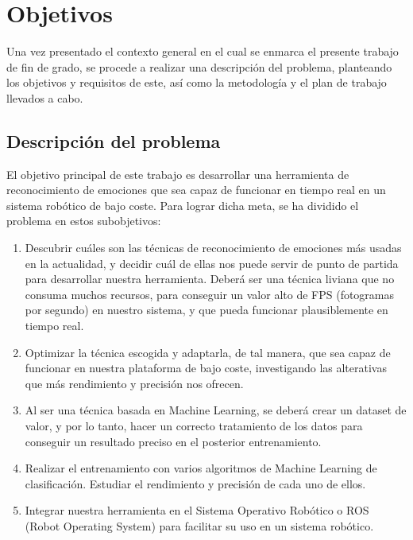 \chapter{Objetivos}
\label{cap:capitulo2}

Una vez presentado el contexto general en el cual se enmarca el presente trabajo de fin de grado, se procede a realizar una descripción del problema, planteando los objetivos y requisitos de este, así como la metodología y el plan de trabajo llevados a cabo.

\section{Descripción del problema}
\label{sec:descripcion}

El objetivo principal de este trabajo es desarrollar una herramienta de reconocimiento de emociones que sea capaz de funcionar en tiempo real en un sistema robótico de bajo coste. Para lograr dicha meta, se ha dividido el problema en estos subobjetivos:
\begin{enumerate}
    \item Descubrir cuáles son las técnicas de reconocimiento de emociones más usadas en la actualidad, y decidir cuál de ellas nos puede servir de punto de partida para desarrollar nuestra herramienta. Deberá ser una técnica liviana que no consuma muchos recursos, para conseguir un valor alto de FPS (fotogramas por segundo) en nuestro sistema, y que pueda funcionar plausiblemente en tiempo real.
    
    \item Optimizar la técnica escogida y adaptarla, de tal manera, que sea capaz de funcionar en nuestra plataforma de bajo coste, investigando las alterativas que más rendimiento y precisión nos ofrecen.
    
    \item Al ser una técnica basada en Machine Learning, se deberá crear un dataset de valor, y por lo tanto, hacer un correcto tratamiento de los datos para conseguir un resultado preciso en el posterior entrenamiento.
    
    \item Realizar el entrenamiento con varios algoritmos de Machine Learning de clasificación. Estudiar el rendimiento y precisión de cada uno de ellos.
    
    \item Integrar nuestra herramienta en el Sistema Operativo Robótico o ROS (Robot Operating System) para facilitar su uso en un sistema robótico.
\end{enumerate}

